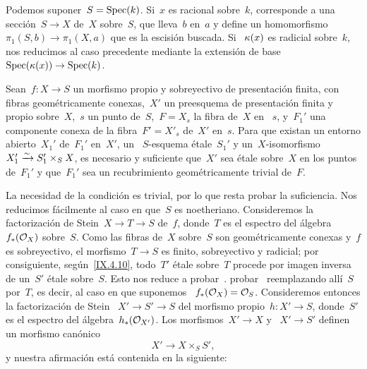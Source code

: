 Podemos suponer~$S=\Spec(k)$. Si~$x$ es racional sobre~$k$, corresponde a una
sección~$S\to X$ de~$X$ sobre~$S$, que lleva~$b$ en~$a$ y define un
homomorfismo~$\pi_1(S,b)\to\pi_1(X,a)$ que es la escisión buscada. Si
~$\kres(x)$ es radicial sobre~$k$, nos reducimos al caso precedente mediante
la extensión de base~$\Spec(\kres(x))\to\Spec(k)$.

\begin{theoreme}
\label{IX.6.5}
Sean~$f\colon X\to S$ un morfismo propio y sobreyectivo de presentación
finita, con fibras geométricamente conexas,~$X'$ un preesquema de presentación
finita y propio sobre~$X$,~$s$ un punto de~$S$,~$F=X_s$ la fibra de~$X$ en
~$s$, y~$F_1'$ una componente conexa de la fibra~$F'=X'_s$ de~$X'$ en~$s$.
Para que existan un entorno abierto~$X_1'$ de~$F_1'$ en~$X'$, un
~$S$-esquema étale~$S_1'$ y un~$X$-isomorfismo
$X_1'\isomto S_1'\times_S X$, es necesario y suficiente que~$X'$ sea étale
sobre~$X$ en los puntos de~$F_1'$ y que~$F_1'$ sea un recubrimiento
geométricamente trivial de~$F$.
\end{theoreme}

La
necesidad de la condición es trivial, por lo que resta probar la suficiencia.
Nos reducimos fácilmente al caso en que~$S$ es noetheriano. Consideremos la
factorización de Stein~$X\to T\to S$ de~$f$, donde~$T$ es el espectro del
álgebra~$f_*(\cal{O}_X)$ sobre~$S$. Como las fibras de~$X$ sobre~$S$ son
geométricamente conexas y~$f$ es sobreyectivo, el morfismo~$T\to S$ es finito,
sobreyectivo y radicial; por consiguiente, según~\eqref{IX.4.10}, todo~$T'$
étale sobre~$T$ procede por imagen inversa de un~$S'$ étale sobre~$S$.
Esto nos reduce a
{probar~.}
{probar~}
reemplazando allí~$S$ por~$T$, es decir, al caso en que suponemos
~$f_*(\cal{O}_X)=\cal{O}_S$. Consideremos entonces la factorización de Stein
~$X'\to S'\to S$ del morfismo propio~$h\colon X'\to S$, donde~$S'$ es el
espectro del álgebra~$h_*(\cal{O}_{X'})$. Los morfismos~$X'\to X$ y
~$X'\to S'$ definen un morfismo canónico
$$
X'\to X\times_S S',
$$
y nuestra afirmación está contenida en la siguiente:
